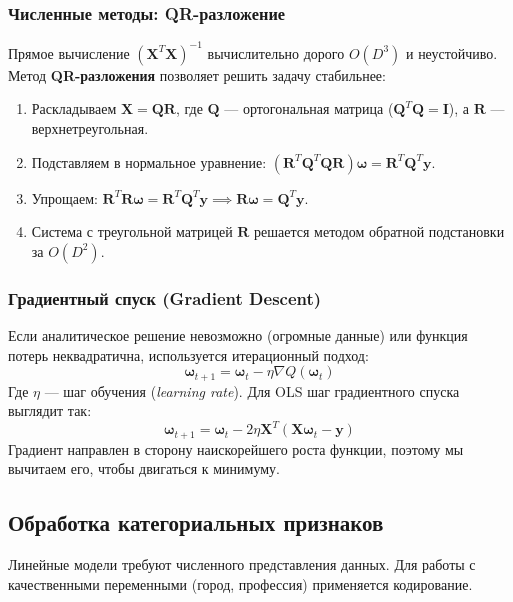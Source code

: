 \documentclass[12pt]{article}
\begin{document}
\subsubsection{Численные методы: QR-разложение}
Прямое вычисление $(\mathbf{X}^T \mathbf{X})^{-1}$ вычислительно дорого $O(D^3)$ и неустойчиво. Метод \textbf{QR-разложения} позволяет решить задачу стабильнее:
\begin{enumerate}
    \item Раскладываем $\mathbf{X} = \mathbf{QR}$, где $\mathbf{Q}$ — ортогональная матрица ($\mathbf{Q}^T\mathbf{Q} = \mathbf{I}$), а $\mathbf{R}$ — верхнетреугольная.
    \item Подставляем в нормальное уравнение: $(\mathbf{R}^T \mathbf{Q}^T \mathbf{Q} \mathbf{R}) \mathbf{\omega} = \mathbf{R}^T \mathbf{Q}^T \mathbf{y}$.
    \item Упрощаем: $\mathbf{R}^T \mathbf{R} \mathbf{\omega} = \mathbf{R}^T \mathbf{Q}^T \mathbf{y} \implies \mathbf{R} \mathbf{\omega} = \mathbf{Q}^T \mathbf{y}$.
    \item Система с треугольной матрицей $\mathbf{R}$ решается методом обратной подстановки за $O(D^2)$.
\end{enumerate}

\subsubsection{Градиентный спуск (Gradient Descent)}
Если аналитическое решение невозможно (огромные данные) или функция потерь неквадратична, используется итерационный подход:
\[ \mathbf{\omega}_{t+1} = \mathbf{\omega}_t - \eta \nabla Q(\mathbf{\omega}_t) \]
Где $\eta$ — шаг обучения (\textit{learning rate}).
Для OLS шаг градиентного спуска выглядит так:
\[ \mathbf{\omega}_{t+1} = \mathbf{\omega}_t - 2\eta \mathbf{X}^T (\mathbf{X}\mathbf{\omega}_t - \mathbf{y}) \]
Градиент направлен в сторону наискорейшего роста функции, поэтому мы вычитаем его, чтобы двигаться к минимуму.

\subsection{Обработка категориальных признаков}
Линейные модели требуют численного представления данных. Для работы с качественными переменными (город, профессия) применяется кодирование.
\end{document}
